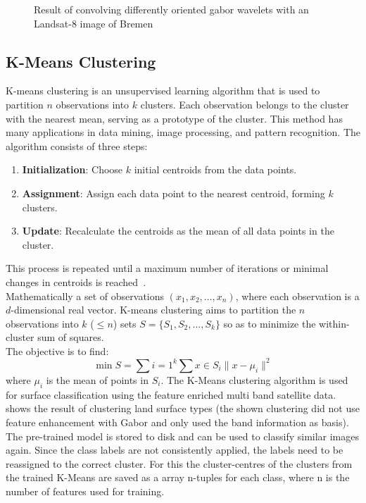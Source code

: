 \documentclass[12pt,a4paper, english,twoside]{article}
\begin{document}
\begin{figure}[!htbp]
\begin{subfigure}[b]{0.45\textwidth}
         \label{fig:feat06}
     \end{subfigure}
        \caption{Result of convolving differently oriented gabor wavelets with an Landsat-8 image of Bremen}\label{fig:gaborExample}
    \end{figure}

%
\newpage
  \subsection{K-Means Clustering}\label{sec:kmeans}
    K-means clustering is an unsupervised learning algorithm that is used to partition $n$ observations into $k$ clusters. 
    Each observation belongs to the cluster with the nearest mean, serving as a prototype of the cluster. 
    This method has many applications in data mining, image processing, and pattern recognition.
    The algorithm consists of three steps:
    \begin{enumerate}
        \item \textbf{Initialization}: Choose $k$ initial centroids from the data points.
        \item \textbf{Assignment}: Assign each data point to the nearest centroid, forming $k$ clusters.
        \item \textbf{Update}: Recalculate the centroids as the mean of all data points in the cluster. 
    \end{enumerate}
    This process is repeated until a maximum number of iterations or minimal changes in centroids is reached~\autocite{Sinaga2020}.\\ 
    Mathematically a set of observations $(x_1, x_2, \ldots, x_n)$, where each observation is a $d$-dimensional real vector.
    K-means clustering aims to partition the $n$ observations into $k$ ($\leq n$) sets $S = \{S_1, S_2, \ldots, S_k\}$ so as to minimize the within-cluster sum of squares. \\
    The objective is to find:
    \begin{equation}
        \min{S} = \sum{i=1}^{k} \sum{x \in S_i} \| x - \mu_i \|^2
    \end{equation}
    where $\mu_i$ is the mean of points in $S_i$.
    The K-Means clustering algorithm is used for surface classification using the feature enriched multi band satellite data.
     shows the result of clustering land surface types (the shown clustering did not use feature enhancement with Gabor and only used the band information as basis).
%
    The pre-trained model is stored to disk and can be used to classify similar images again. 
    Since the class labels are not consistently applied, the labels need to be reassigned to the correct cluster.
    For this the cluster-centres of the clusters from the trained K-Means are saved as a array n-tuples for each class, where n is the number of features used for training.
    \newpage
\end{document}

